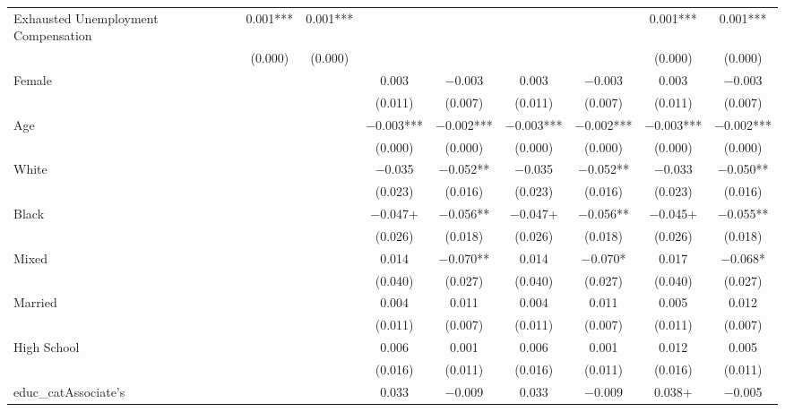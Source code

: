 \documentclass[
]{article}
\begin{document}
\begin{table}
{\begin{tabular}[t]{lcccccccccccc}
Exhausted Unemployment Compensation &  &  &  &  & \num{0.001}*** & \num{0.001}*** &  &  &  &  & \num{0.001}*** & \num{0.001}***\\
 &  &  &  &  & (\num{0.000}) & (\num{0.000}) &  &  &  &  & (\num{0.000}) & (\num{0.000})\\
Female &  &  &  &  &  &  & \num{0.003} & \num{-0.003} & \num{0.003} & \num{-0.003} & \num{0.003} & \num{-0.003}\\
 &  &  &  &  &  &  & (\num{0.011}) & (\num{0.007}) & (\num{0.011}) & (\num{0.007}) & (\num{0.011}) & \vphantom{1} (\num{0.007})\\
Age &  &  &  &  &  &  & \num{-0.003}*** & \num{-0.002}*** & \num{-0.003}*** & \num{-0.002}*** & \num{-0.003}*** & \num{-0.002}***\\
 &  &  &  &  &  &  & (\num{0.000}) & (\num{0.000}) & (\num{0.000}) & (\num{0.000}) & (\num{0.000}) & (\num{0.000})\\
White &  &  &  &  &  &  & \num{-0.035} & \num{-0.052}** & \num{-0.035} & \num{-0.052}** & \num{-0.033} & \num{-0.050}**\\
 &  &  &  &  &  &  & (\num{0.023}) & (\num{0.016}) & (\num{0.023}) & (\num{0.016}) & (\num{0.023}) & (\num{0.016})\\
Black &  &  &  &  &  &  & \num{-0.047}+ & \num{-0.056}** & \num{-0.047}+ & \num{-0.056}** & \num{-0.045}+ & \num{-0.055}**\\
 &  &  &  &  &  &  & (\num{0.026}) & (\num{0.018}) & (\num{0.026}) & (\num{0.018}) & (\num{0.026}) & (\num{0.018})\\
Mixed &  &  &  &  &  &  & \num{0.014} & \num{-0.070}** & \num{0.014} & \num{-0.070}* & \num{0.017} & \num{-0.068}*\\
 &  &  &  &  &  &  & (\num{0.040}) & (\num{0.027}) & (\num{0.040}) & (\num{0.027}) & (\num{0.040}) & (\num{0.027})\\
Married &  &  &  &  &  &  & \num{0.004} & \num{0.011} & \num{0.004} & \num{0.011} & \num{0.005} & \num{0.012}\\
 &  &  &  &  &  &  & (\num{0.011}) & (\num{0.007}) & (\num{0.011}) & (\num{0.007}) & (\num{0.011}) & (\num{0.007})\\
High School &  &  &  &  &  &  & \num{0.006} & \num{0.001} & \num{0.006} & \num{0.001} & \num{0.012} & \num{0.005}\\
 &  &  &  &  &  &  & (\num{0.016}) & (\num{0.011}) & (\num{0.016}) & (\num{0.011}) & (\num{0.016}) & (\num{0.011})\\
educ\_catAssociate's &  &  &  &  &  &  & \num{0.033} & \num{-0.009} & \num{0.033} & \num{-0.009} & \num{0.038}+ & \num{-0.005}\\

\end{tabular}}
\end{table}
\end{document}

